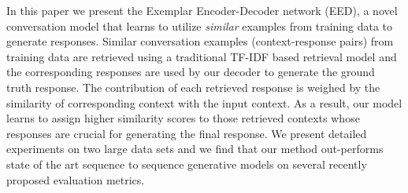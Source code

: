 In this paper we present the Exemplar Encoder-Decoder network (EED), a novel conversation model that learns to utilize \textit{similar} examples from training data to generate responses. Similar conversation examples (context-response pairs) from training data are retrieved using a traditional TF-IDF based retrieval model and the corresponding responses are used by our decoder to generate the ground truth response. The contribution of each retrieved response is weighed by the similarity of corresponding context with the input context. As a result, our model learns to assign higher similarity scores to those retrieved contexts whose responses are crucial for generating the final response. We present detailed experiments on two large data sets and we find that our method out-performs state of the art sequence to sequence generative models on several recently proposed evaluation metrics.
